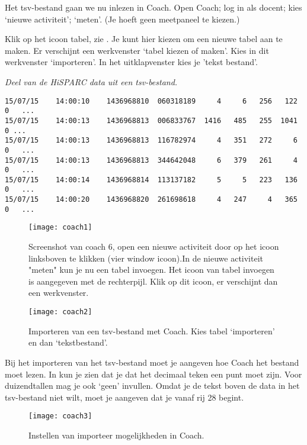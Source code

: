Het tsv-bestand gaan we nu inlezen in Coach. Open Coach; log in als docent; kies `nieuwe activiteit';
`meten'. (Je hoeft geen meetpaneel te kiezen.)

Klik op het icoon tabel, zie . Je kunt hier kiezen om een
nieuwe tabel aan te maken. Er verschijnt een werkvenster `tabel kiezen of maken'.
Kies in dit werkvenster `importeren'. In het uitklapvenster kies je 'tekst bestand'.

\textit{Deel van de HiSPARC data uit een tsv-bestand.}
\begin{verbatim}
15/07/15	14:00:10	1436968810	060318189     4	    6	256	  122	0	...
15/07/15	14:00:13	1436968813	006833767  1416	  485	255	 1041 0 ...
15/07/15	14:00:13	1436968813	116782974     4	  351	272	    6	0	...
15/07/15	14:00:13	1436968813	344642048     6	  379	261	    4	0	...
15/07/15	14:00:14	1436968814	113137182     5	    5	223	  136	0	...
15/07/15	14:00:20	1436968820	261698618     4	  247	  4	  365	0	...
\end{verbatim}

\begin{figure}
    \centering
    \texttt{[image: coach1]}
    \caption{Screenshot van coach 6, open een nieuwe activiteit door op
    het icoon linksboven te klikken (vier window icoon).In de nieuwe activiteit
    "meten" kun je nu een tabel invoegen. Het icoon van tabel invoegen is
    aangegeven met de rechterpijl. Klik op dit icoon, er verschijnt dan een werkvenster.}
    \label{fig:coach1}
\end{figure}

\begin{figure}
    \centering
    \texttt{[image: coach2]}
    \caption{Importeren van een tsv-bestand met Coach. Kies tabel `importeren' en
    dan `tekstbestand'.}
    \label{fig:coach2}
\end{figure}

Bij het importeren van het tsv-bestand moet je aangeven hoe Coach het bestand moet
lezen. In  kun je zien dat je dat het decimaal teken
een punt moet zijn. Voor duizendtallen mag je ook `geen' invullen. Omdat je de tekst
boven de data in het tsv-bestand niet wilt, moet je aangeven dat je vanaf rij
28 begint.

\begin{figure}
    \centering
    \texttt{[image: coach3]}
    \caption{Instellen van importeer mogelijkheden in Coach.}
    \label{fig:coach3}
\end{figure}

